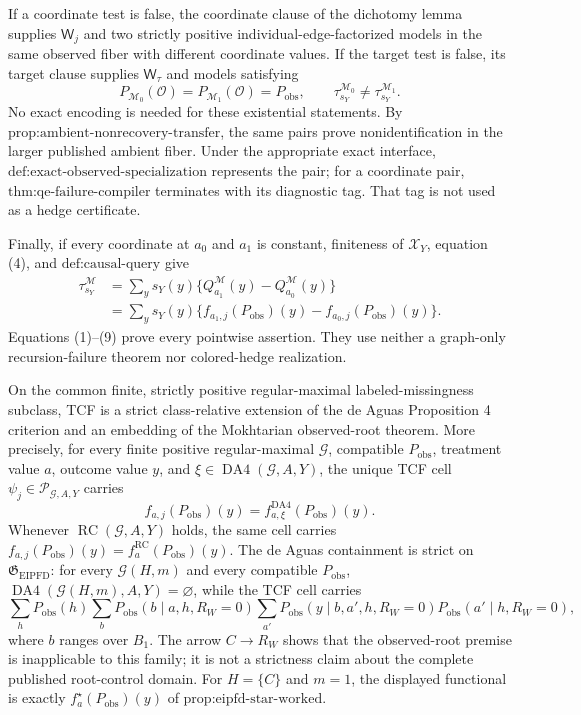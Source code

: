 If a coordinate test is false, the coordinate clause of the dichotomy lemma supplies \(\mathsf W_j\) and two strictly positive individual-edge-factorized models in the same observed fiber with different coordinate values. If the target test is false, its target clause supplies \(\mathsf W_{\tau}\) and models satisfying
\[
P_{\mathcal M_0}(\mathcal O)=P_{\mathcal M_1}(\mathcal O)=P_{\mathrm{obs}},
\qquad
\tau_{s_Y}^{\mathcal M_0}\ne\tau_{s_Y}^{\mathcal M_1}.
\tag{8}
\]
No exact encoding is needed for these existential statements. By \(\text{prop:ambient-nonrecovery-transfer}\), the same pairs prove nonidentification in the larger published ambient fiber. Under the appropriate exact interface, \(\text{def:exact-observed-specialization}\) represents the pair; for a coordinate pair, \(\text{thm:qe-failure-compiler}\) terminates with its diagnostic tag. That tag is not used as a hedge certificate.

Finally, if every coordinate at \(a_0\) and \(a_1\) is constant, finiteness of \(\mathcal X_Y\), equation (4), and \(\text{def:causal-query}\) give
\[
\begin{aligned}
\tau_{s_Y}^{\mathcal M}
&=\sum_y s_Y(y)\{Q_{a_1}^{\mathcal M}(y)-Q_{a_0}^{\mathcal M}(y)\}\\
&=\sum_y s_Y(y)
\{f_{a_1,j}(P_{\mathrm{obs}})(y)-f_{a_0,j}(P_{\mathrm{obs}})(y)\}.
\end{aligned}
\tag{9}
\]
Equations (1)--(9) prove every pointwise assertion. They use neither a graph-only recursion-failure theorem nor colored-hedge realization.

On the common finite, strictly positive regular-maximal labeled-missingness subclass, TCF is a strict class-relative extension of the de Aguas Proposition 4 criterion and an embedding of the Mokhtarian observed-root theorem. More precisely, for every finite positive regular-maximal \(\mathcal G\), compatible \(P_{\mathrm{obs}}\), treatment value \(a\), outcome value \(y\), and \(\xi\in\operatorname{DA4}(\mathcal G,A,Y)\), the unique TCF cell \(\psi_j\in\mathscr P_{\mathcal G,A,Y}\) carries \[f_{a,j}(P_{\mathrm{obs}})(y)=f^{\mathrm{DA4}}_{a,\xi}(P_{\mathrm{obs}})(y).\] Whenever \(\operatorname{RC}(\mathcal G,A,Y)\) holds, the same cell carries \(f_{a,j}(P_{\mathrm{obs}})(y)=f_a^{\mathrm{RC}}(P_{\mathrm{obs}})(y)\). The de Aguas containment is strict on \(\mathfrak G_{\mathrm{EIPFD}}\): for every \(\mathcal G(H,m)\) and every compatible \(P_{\mathrm{obs}}\), \(\operatorname{DA4}(\mathcal G(H,m),A,Y)=\varnothing\), while the TCF cell carries \[\sum_hP_{\mathrm{obs}}(h)\sum_bP_{\mathrm{obs}}(b\mid a,h,R_W=0)\sum_{a'}P_{\mathrm{obs}}(y\mid b,a',h,R_W=0)P_{\mathrm{obs}}(a'\mid h,R_W=0),\] where \(b\) ranges over \(B_1\). The arrow \(C\to R_W\) shows that the observed-root premise is inapplicable to this family; it is not a strictness claim about the complete published root-control domain. For \(H=\{C\}\) and \(m=1\), the displayed functional is exactly \(f_a^\star(P_{\mathrm{obs}})(y)\) of \(\text{prop:eipfd-star-worked}\).

